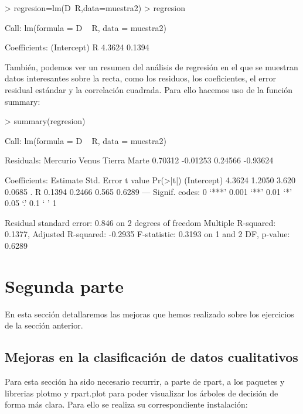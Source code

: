 \documentclass [a4paper] {article}
\begin{document}
\begin{Schunk}
\begin{Sinput}
> regresion=lm(D~R,data=muestra2)
> regresion
\end{Sinput}
\begin{Soutput}
Call:
lm(formula = D ~ R, data = muestra2)

Coefficients:
(Intercept)            R  
     4.3624       0.1394  
\end{Soutput}
\end{Schunk}

También, podemos ver un resumen del análisis de regresión en el que se muestran datos interesantes sobre la recta,
como los residuos, los coeficientes, el error residual estándar y la correlación cuadrada. Para ello hacemos uso
de la función summary: 

\begin{Schunk}
\begin{Sinput}
> summary(regresion)
\end{Sinput}
\begin{Soutput}
Call:
lm(formula = D ~ R, data = muestra2)

Residuals:
Mercurio    Venus   Tierra    Marte 
 0.70312 -0.01253  0.24566 -0.93624 

Coefficients:
            Estimate Std. Error t value Pr(>|t|)  
(Intercept)   4.3624     1.2050   3.620   0.0685 .
R             0.1394     0.2466   0.565   0.6289  
---
Signif. codes:  0 ‘***’ 0.001 ‘**’ 0.01 ‘*’ 0.05 ‘.’ 0.1 ‘ ’ 1

Residual standard error: 0.846 on 2 degrees of freedom
Multiple R-squared:  0.1377,	Adjusted R-squared:  -0.2935 
F-statistic: 0.3193 on 1 and 2 DF,  p-value: 0.6289
\end{Soutput}
\end{Schunk}


\section{Segunda parte}

En esta sección detallaremos las mejoras que hemos realizado sobre los ejercicios de la sección anterior.

\subsection{Mejoras en la clasificación de datos cualitativos}
Para esta sección ha sido necesario recurrir, a parte de rpart, a los paquetes y librerias plotmo y rpart.plot para
poder visualizar los árboles de decisión de forma más clara. Para ello se realiza su correspondiente instalación:
\end{document}
